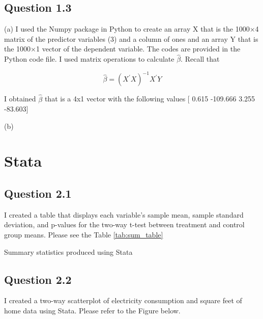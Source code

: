 \documentclass{article}
\begin{document}
\FloatBarrier
\subsection*{Question 1.3}
(a) I used the Numpy package in Python to create an array X that is the 1000×4 matrix of the predictor variables (3) and a column of ones and an array Y that is the 1000×1 vector
of the dependent variable. The codes are provided in the Python code file. I used matrix operations to calculate \(\hat{\beta}\). Recall that 

\[\hat{\beta} = (X^{'}X)^{-1}X^{'}Y \]

I obtained \(\hat{\beta}\) that is a 4x1 vector with the following values [   0.615 -109.666  3.255 -83.603]

(b) 

\FloatBarrier
\section*{Stata}

\subsection*{Question 2.1}

I created a table that displays each variable’s sample mean, sample standard deviation, and p-values for the two-way t-test between treatment and control group means. Please see the Table \ref{tab:sum_table}


\begin{table}[hbt!]
    \centering
    
    \caption{Summary statistics produced using Stata}
    \label{tab:sum_table}
\end{table}

\subsection*{Question 2.2}

I created a two-way scatterplot of electricity consumption and square feet of home data using Stata. Please refer to the Figure below.
\end{document}
